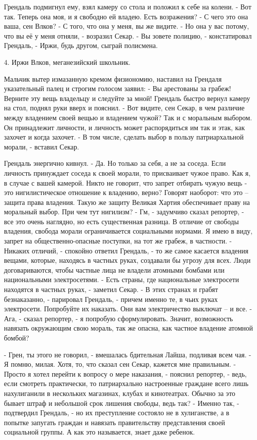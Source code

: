 \documentclass{book}
\begin{document}
Грендаль подмигнул ему, взял камеру со стола и положил к себе на колени.
- Вот так. Теперь она моя, и я свободно ей владею. Есть возражения?
- С чего это она ваша, сен Влков?
- С того, что она у меня, вы же видите.
- Но она у вас потому, что вы её у меня отняли, - возразил Секар.
- Вы зовете полицию, - констатировал Грендаль, - Иржи, будь другом, сыграй полисмена.


4. Иржи Влков, меганезийский школьник.


Мальчик вытер измазанную кремом физиономию, наставил на Грендаля указательный палец и строгим голосом заявил:
- Вы арестованы за грабеж! Верните эту вещь владельцу и следуйте за мной!
Грендаль быстро вернул камеру на стол, поднял руки вверх и пояснил.
- Вот видите, сен Секар, в чем различие между владением своей вещью и владением чужой? Так и с моральным выбором. Он принадлежит личности, и личность может распорядиться им так и этак, как захочет и когда захочет.
- В том числе, сделать выбор в пользу патриархальной морали, - вставил Секар.

Грендаль энергично кивнул.
- Да. Но только за себя, а не за соседа. Если личность принуждает соседа к своей морали, то присваивает чужое право. Как я, в случае с вашей камерой. Никто не говорит, что запрет отбирать чужую вещь - это нигилистическое отношение к владению, верно? Говорят наоборот: что это -- защита права владения. Такую же защиту Великая Хартия обеспечивает праву на моральный выбор. При чем тут нигилизм?
- Гм, - задумчиво сказал репортер, - все это очень наглядно, но есть существенная разница. В отличие от свободы владения, свобода морали ограничивается социальными нормами. Я имею в виду, запрет на общественно-опасные поступки, на тот же грабеж, в частности.
- Никаких отличий, - спокойно ответил Грендаль, - то же самое касается владения вещами, которые, находясь в частных руках, создавали бы угрозу для всех. Люди договариваются, чтобы частные лица не владели атомными бомбами или национальными электросетями.
- Есть страны, где национальные электросети находятся в частных руках, - заметил Секар.
- В этих странах и грабят безнаказанно, - парировал Грендаль, - причем именно те, в чьих руках электросети. Попробуйте их наказать. Они вам электричество выключат -- и все.
- Ага, - сказал репортер, - я попробую сформулировать. Значит, возможность навязать окружающим свою мораль, так же опасна, как частное владение атомной бомбой?

- Грен, ты этого не говорил, - вмешалась бдительная Лайша, подливая всем чая.
- Я помню, милая. Хотя, то, что сказал сен Секар, кажется мне правильным.
- Просто я хотел перейти к вопросу о мере наказания, - пояснил репортер, - ведь, если смотреть практически, то патриархально настроенные граждане всего лишь нахулиганили в нескольких магазинах, клубах и кинотеатрах. Обычно за это бывает штраф и небольшой срок лишения свободы, ведь так?
- Именно так, - подтвердил Грендаль, - но их преступление состояло не в хулиганстве, а в попытке запугать граждан и навязать правительству представления своей социальной группы. А как это называется, знает даже ребенок.
\end{document}
